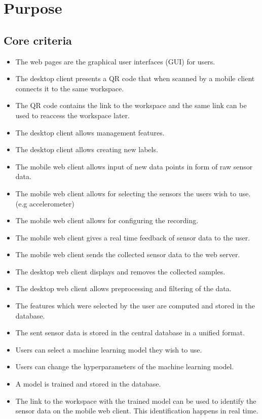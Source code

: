 \section{Purpose}

\subsection{Core criteria}
\begin{itemize}
    \item The web pages are the graphical user interfaces (GUI) for users.
    \item The desktop client presents a QR code that when scanned by a mobile client connects it to the same \gls{workspace}.
    \item The QR code contains the link to the \gls{workspace} and the same link can be used to reaccess the workspace later.
    \item The desktop client allows management features.
    \item The desktop client allows creating new labels.
    \item The mobile web client allows input of new data points in form of raw sensor data.
    \item The mobile web client allows for selecting the sensors the users wish to use. (e.g accelerometer)
    \item The mobile web client allows for configuring the recording.
    \item The mobile web client gives a real time feedback of sensor data to the user.
    \item The mobile web client sends the collected sensor data to the web server.
    \item The desktop web client displays and removes the collected samples.
    \item The desktop web client allows preprocessing and filtering of the data.
    \item The features which were selected by the user are computed and stored in the database.
    \item The sent sensor data is stored in the central database in a unified format.
    \item Users can select a machine learning model they wish to use.
    \item Users can change the hyperparameters of the machine learning model.
    \item A model is trained and stored in the database.
    \item The link to the workspace with the trained model can be used to identify the sensor data on the mobile web client. This identification happens in real time.
\end{itemize}

